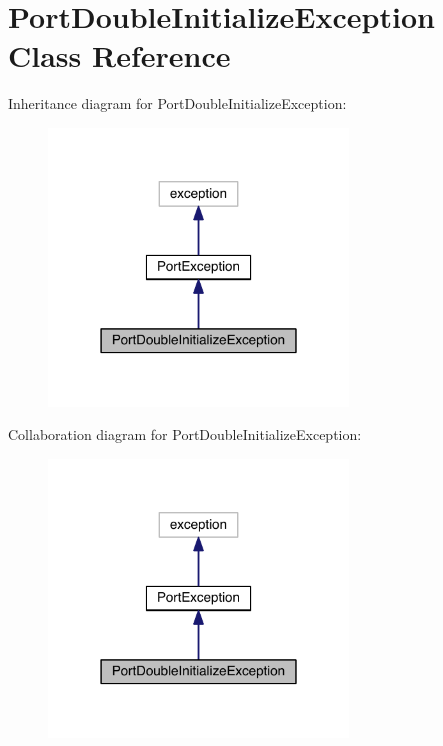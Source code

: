 \hypertarget{class_port_double_initialize_exception}{}\section{Port\+Double\+Initialize\+Exception Class Reference}
\label{class_port_double_initialize_exception}


Inheritance diagram for Port\+Double\+Initialize\+Exception\+:
\nopagebreak
\begin{figure}[H]
\begin{center}
\leavevmode
\includegraphics[width=226pt]{class_port_double_initialize_exception__inherit__graph}
\end{center}
\end{figure}


Collaboration diagram for Port\+Double\+Initialize\+Exception\+:
\nopagebreak
\begin{figure}[H]
\begin{center}
\leavevmode
\includegraphics[width=226pt]{class_port_double_initialize_exception__coll__graph}
\end{center}
\end{figure}
